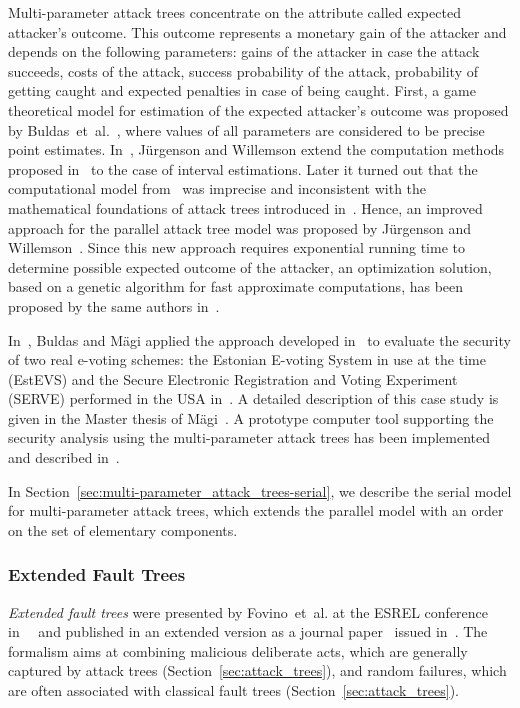 \documentclass[a4paper]{article}
\begin{document}
Multi-parameter attack trees concentrate on the attribute called expected
attacker's outcome. This outcome represents a monetary gain of the attacker and
depends on the following parameters: gains of the attacker in case the attack
succeeds, costs of the attack, success probability of the attack, probability of
getting caught and expected penalties in case of being caught. First, a game
theoretical model for estimation of the expected attacker's outcome was proposed
by Buldas~et~al.~\cite{BuLaPrSaWi}, where values of all parameters are
considered to be precise point estimates. In~\cite{JuWi}, J\"{u}rgenson and
Willemson extend the computation methods proposed in~\cite{BuLaPrSaWi} to the
case of interval estimations. Later it turned out that the computational model
from~\cite{BuLaPrSaWi} was imprecise and inconsistent with the mathematical
foundations of attack trees introduced in~\cite{MaOo}. Hence, an improved
approach for the parallel attack tree model was proposed by J\"{u}rgenson and
Willemson~\cite{JuWi3}. Since this new approach requires exponential running
time to determine possible expected outcome of the attacker, an optimization
solution, based on a genetic algorithm for fast approximate computations, has
been proposed by the same authors in~\cite{JuWi2}.

In~\cite{BuTr}, Buldas and M\"{a}gi applied the approach developed
in~\cite{BuLaPrSaWi} to evaluate the security of two real e-voting schemes: the
Estonian E-voting System in use at the time (EstEVS) and the Secure Electronic
Registration and Voting Experiment (SERVE) performed in the USA in~. A
detailed description of this case study is given in the Master thesis of
M\"{a}gi~\cite{Magi}. A prototype computer tool supporting the security analysis
using the multi-parameter attack trees has been implemented~\cite{Program4} and
described in~\cite{AndrusenkoMaster}. 

In Section~\ref{sec:multi-parameter_attack_trees-serial}, we describe
the serial model for multi-parameter attack trees,
which extends the parallel model with an order on the set of elementary
components.

\subsubsection{Extended Fault Trees} 
\label{sec:extended_fault_trees}

\emph{Extended fault trees} were presented by Fovino~et~al. at the ESREL
conference in~~\cite{MaFoCi} and published in an extended version as a
journal paper~\cite{FoMaCi} issued in~. The formalism aims at combining
malicious deliberate acts, which are generally captured by attack trees
(Section~\ref{sec:attack_trees}), and random failures, which are often
associated with classical fault trees (Section~\ref{sec:attack_trees}).
\end{document}
